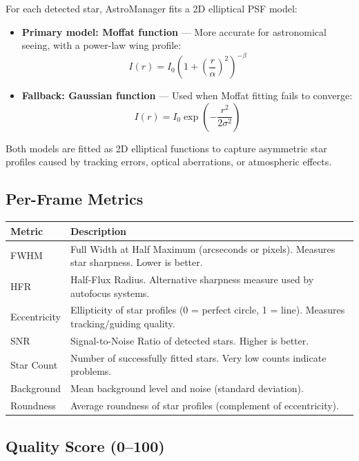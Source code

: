 \documentclass[11pt,a4paper]{article}
\begin{document}
For each detected star, AstroManager fits a 2D elliptical PSF model:

\begin{itemize}
    \item \textbf{Primary model: Moffat function} --- More accurate for astronomical seeing, with a power-law wing profile: \[ I(r) = I_0 \left(1 + \left(\frac{r}{\alpha}\right)^2\right)^{-\beta} \]
    \item \textbf{Fallback: Gaussian function} --- Used when Moffat fitting fails to converge: \[ I(r) = I_0 \exp\left(-\frac{r^2}{2\sigma^2}\right) \]
\end{itemize}

Both models are fitted as 2D elliptical functions to capture asymmetric star profiles caused by tracking errors, optical aberrations, or atmospheric effects.

\subsection{Per-Frame Metrics}

\begin{center}
\begin{tabular}{lp{9cm}}
\toprule
\textbf{Metric} & \textbf{Description} \\
\midrule
FWHM & Full Width at Half Maximum (arcseconds or pixels). Measures star sharpness. Lower is better. \\
HFR & Half-Flux Radius. Alternative sharpness measure used by autofocus systems. \\
Eccentricity & Ellipticity of star profiles (0 = perfect circle, 1 = line). Measures tracking/guiding quality. \\
SNR & Signal-to-Noise Ratio of detected stars. Higher is better. \\
Star Count & Number of successfully fitted stars. Very low counts indicate problems. \\
Background & Mean background level and noise (standard deviation). \\
Roundness & Average roundness of star profiles (complement of eccentricity). \\
\bottomrule
\end{tabular}
\end{center}

\subsection{Quality Score (0--100)}
\end{document}
